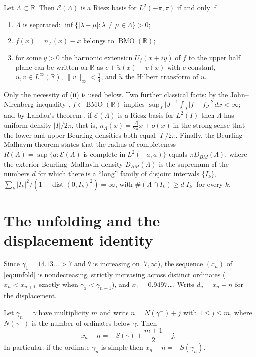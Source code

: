 \documentclass[11pt]{article}
\DeclareMathOperator{\BMO}{BMO}
\DeclareMathOperator{\dist}{dist}
\newcommand{\R}{\mathbb{R}}
\newcommand{\Lam}{\Lambda}
\newcommand{\E}{\mathcal{E}}
\begin{document}
\begin{theorem}\label{thm:HNP}
Let $\Lam\subset\R$. Then $\E(\Lam)$ is a Riesz basis for $L^2(-\pi,\pi)$ if and only if
\begin{enumerate}
\item[(i)] $\Lam$ is separated: $\inf\{|\lambda-\mu|:\lambda\ne\mu\in\Lam\}>0$;
\item[(ii)] $f(x)=n_\Lam(x)-x$ belongs to $\BMO(\R)$;
\item[(iii)] for some $y>0$ the harmonic extension $U_f(x+iy)$ of $f$ to the upper half plane can be written on $\R$ as $c+\tilde u(x)+v(x)$ with $c$ constant, $u,v\in L^\infty(\R)$, $\|v\|_\infty<\frac14$, and $\tilde u$ the Hilbert transform of $u$.
\end{enumerate}
\end{theorem}

Only the necessity of (ii) is used below. Two further classical facts: by the John--Nirenberg inequality \cite{JohnNirenberg}, $f\in\BMO(\R)$ implies $\sup_J|J|^{-1}\int_J|f-f_J|^2\,dx<\infty$; and by Landau's theorem \cite{Landau67}, if $\E(\Lam)$ is a Riesz basis for $L^2(I)$ then $\Lam$ has uniform density $|I|/2\pi$, that is, $n_\Lam(x)=\frac{|I|}{2\pi}x+o(x)$ in the strong sense that the lower and upper Beurling densities both equal $|I|/2\pi$. Finally, the Beurling--Malliavin theorem \cite{BM67,KoosisII} states that the radius of completeness $R(\Lam)=\sup\{a:\E(\Lam)\text{ is complete in }L^2(-a,a)\}$ equals $\pi D_{BM}(\Lam)$, where the exterior Beurling--Malliavin density $D_{BM}(\Lam)$ is the supremum of the numbers $d$ for which there is a ``long'' family of disjoint intervals $\{I_k\}$, $\sum_k|I_k|^2/(1+\dist(0,I_k)^2)=\infty$, with $\#(\Lam\cap I_k)\ge d|I_k|$ for every $k$.

\section{The unfolding and the displacement identity}\label{sec:identity}

Since $\gamma_1=14.13\ldots>7$ and $\theta$ is increasing on $[7,\infty)$, the sequence $(x_n)$ of \eqref{eq:unfold} is nondecreasing, strictly increasing across distinct ordinates ($x_n<x_{n+1}$ exactly when $\gamma_n<\gamma_{n+1}$), and $x_1=0.9497\ldots$. Write $d_n=x_n-n$ for the displacement.

\begin{theorem}\label{thm:identity}
Let $\gamma_n=\gamma$ have multiplicity $m$ and write $n=N(\gamma^-)+j$ with $1\le j\le m$, where $N(\gamma^-)$ is the number of ordinates below $\gamma$. Then
\[
x_n-n=-S(\gamma)+\frac{m+1}{2}-j .
\]
In particular, if the ordinate $\gamma_n$ is simple then $x_n-n=-S(\gamma_n)$.
\end{theorem}
\end{document}
